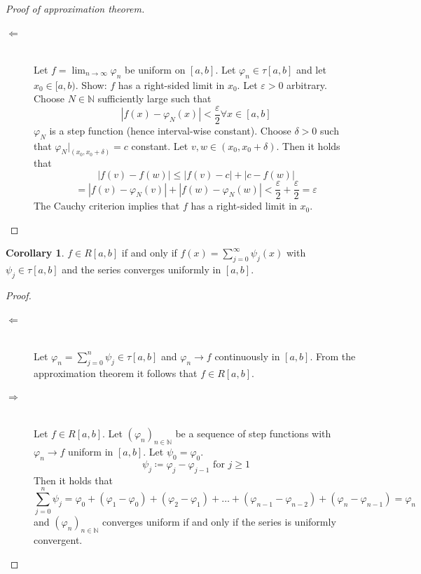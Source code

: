 \documentclass[a4paper,landscape,twocolumn]{article}
\theoremstyle{definition}
\newtheorem{cor}{Corollary}
\newcommand\abs[1]{\left|#1\right|}
\begin{document}
\begin{proof}[Proof of approximation theorem]
  \begin{description}
    \item[$\Leftarrow$] \hfill{} \\
      Let $f = \lim_{n\to\infty} \varphi_n$ be uniform on $[a,b]$.
      Let $\varphi_n \in \tau[a,b]$ and let $x_0 \in [a,b)$.
      Show: $f$ has a right-sided limit in $x_0$.
      Let $\varepsilon > 0$ arbitrary. Choose $N \in \mathbb N$ sufficiently
      large such that
      \[
        \abs{f(x) - \varphi_N(x)} < \frac\varepsilon2
        \forall x \in [a,b]
      \]
      $\varphi_N$ is a step function (hence interval-wise constant).
      Choose $\delta > 0$ such that $\varphi_N|_{(x_0,x_0 + \delta)} = c$
      constant. Let $v,w \in (x_0, x_0 + \delta)$. Then it holds that
      \[ \abs{f(v) - f(w)} \leq \abs{f(v) - c} + \abs{c - f(w)} \]
      \[
        = \abs{f(v) - \varphi_N(v)} + \abs{f(w) - \varphi_N(w)}
        < \frac\varepsilon2 + \frac\varepsilon2 = \varepsilon
      \]
      The Cauchy criterion implies that $f$ has a right-sided limit in $x_0$.
  \end{description}
\end{proof}

\begin{cor}
  $f \in R[a,b]$ if and only if $f(x) = \sum_{j=0}^\infty \psi_j(x)$ with
  $\psi_j \in \tau[a,b]$ and the series converges uniformly in $[a,b]$.
\end{cor}
\begin{proof}
  \begin{description}
    \item[$\Leftarrow$] \hfill{} \\
      Let $\varphi_n = \sum_{j=0}^n \psi_j \in \tau[a,b]$ and $\varphi_n \to f$
      continuously in $[a,b]$. From the approximation theorem it follows that
      $f \in R[a,b]$.
    \item[$\Rightarrow$] \hfill{} \\
      Let $f \in R[a,b]$. Let $(\varphi_n)_{n \in \mathbb N}$ be a sequence of step
      functions with $\varphi_n \to f$ uniform in $[a,b]$. Let $\psi_0 = \varphi_0$.
      \[ \psi_j \coloneqq \varphi_j - \varphi_{j-1} \text{ for } j \geq 1 \]
      Then it holds that
      \[
        \sum_{j=0}^n \psi_j = \varphi_0 + (\varphi_1 - \varphi_0) +
          (\varphi_2 - \varphi_1) + \ldots + (\varphi_{n-1} - \varphi_{n-2}) +
          (\varphi_n - \varphi_{n-1})
        = \varphi_n
      \]
      and $(\varphi_n)_{n\in\mathbb N}$ converges uniform if and only if
      the series is uniformly convergent.
  \end{description}
\end{proof}
\end{document}
